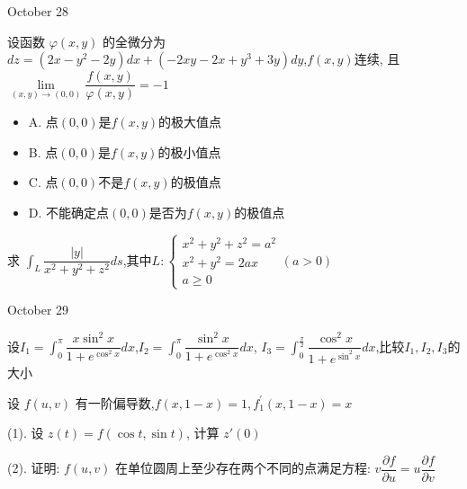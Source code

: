 \begin{solution}
	
\end{solution}


\textcolor{purplea}{October 28}

\begin{example}[][Exam: 36.4.13]
	设函数 $\varphi(x,y)$ 的全微分为 $dz=(2x-y^2-2y)dx+(-2xy-2x+y^3+3y)dy$,$f(x,y)$连续,
	且$\lim\limits_{(x,y)\to (0,0)}\dfrac{f(x,y)}{\varphi(x,y)}=-1$
\begin{itemize}
	\item A. 点$(0,0)$是$f(x,y)$的极大值点
	\item B. 点$(0,0)$是$f(x,y)$的极小值点
	\item C. 点$(0,0)$不是$f(x,y)$的极值点
	\item D. 不能确定点$(0,0)$是否为$f(x,y)$的极值点
\end{itemize}
\end{example}

\begin{solution}
	
\end{solution}

\begin{example}[][Exam: 36.4.14]
	求 $\int_{L}\dfrac{|y|}{x^2+y^2+z^2}ds$,其中$L:\begin{cases}
		x^2+y^2+z^2=a^2\\
		x^2+y^2=2ax\\
		a\geq 0
	\end{cases}(a>0)$
\end{example}


\begin{solution}
	
\end{solution}


\textcolor{purplea}{October 29}

\begin{example}[][Exam: 36.4.15]
	设$I_{1}=\int_{0}^{\pi}\dfrac{x\sin^2 x}{1+e^{\cos^2 x}}dx$,$I_{2}=\int_{0}^{\pi}\dfrac{\sin^2 x}{1+e^{\cos^2 x}}dx$,
	$I_{3}=\int_{0}^{\frac{\pi}{2}}\dfrac{\cos^2 x}{1+e^{\sin^2 x}}dx$,比较$I_{1},I_{2},I_{3}$的大小
\end{example}
\begin{solution}
	
\end{solution}

\begin{example}[][Exam: 36.4.16]
	设 $f(u,v)$ 有一阶偏导数,$f(x,1-x)=1,f_{1}^{'}(x,1-x)=x$

(1). 设 $z(t)=f(\cos t,\sin t)$, 计算 $z'(0)$
 
(2). 证明: $f(u,v)$ 在单位圆周上至少存在两个不同的点满足方程: $v\dfrac{\partial f}{\partial u}=u\dfrac{\partial f}{\partial v}$
\end{example}

